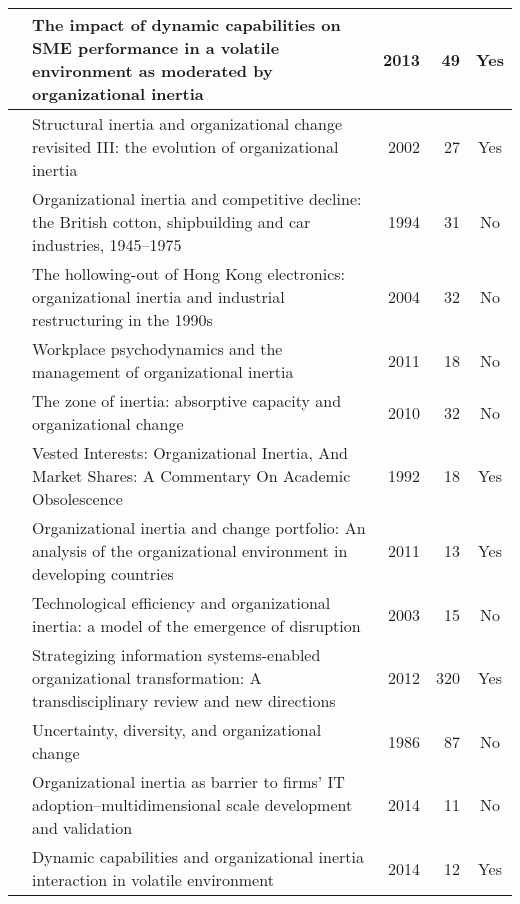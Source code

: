 \begin{longtable}{
    |>{\raggedright\arraybackslash}p{3.7cm}
    |>{\raggedright\arraybackslash}p{3.7cm}
    |r
    |r
    |c
    |}
	\hline 
    \cite{nedzinskas2013impact} & The impact of dynamic capabilities on SME performance in a volatile environment as moderated by organizational inertia & 2013 & 49 & Yes \\
	\hline 
    \cite{hannan2002structural} & Structural inertia and organizational change revisited III: the evolution of organizational inertia & 2002 & 27 & Yes \\
	\hline 
    \cite{lorenz1994organizational} & Organizational inertia and competitive decline: the British cotton, shipbuilding and car industries, 1945--1975 & 1994 & 31 & No \\
	\hline 
    \cite{chiu2004hollowing} & The hollowing-out of Hong Kong electronics: organizational inertia and industrial restructuring in the 1990s & 2004 & 32 & No \\
	\hline 
    \cite{allcorn2011workplace} & Workplace psychodynamics and the management of organizational inertia & 2011 & 18 & No \\
	\hline 
    \cite{godkin2010zone} & The zone of inertia: absorptive capacity and organizational change & 2010 & 32 & No \\
	\hline 
    \cite{bromley1992vested} & Vested Interests: Organizational Inertia, And Market Shares: A Commentary On Academic Obsolescence & 1992 & 18 & Yes \\
	\hline 
    \cite{majid2011organizational} & Organizational inertia and change portfolio: An analysis of the organizational environment in developing countries & 2011 & 13 & Yes \\
	\hline 
    \cite{buchta2003technological} & Technological efficiency and organizational inertia: a model of the emergence of disruption & 2003 & 15 & No \\
	\hline 
    \cite{besson2012strategizing} & Strategizing information systems-enabled organizational transformation: A transdisciplinary review and new directions & 2012 & 320 & Yes \\
	\hline 
    \cite{hannan1986uncertainty} & Uncertainty, diversity, and organizational change & 1986 & 87 & No \\
	\hline 
    \cite{haag2014organizational} & Organizational inertia as barrier to firms’ IT adoption--multidimensional scale development and validation & 2014 & 11 & No \\
	\hline 
    \cite{nedzinskas2014dynamic} & Dynamic capabilities and organizational inertia interaction in volatile environment & 2014 & 12 & Yes \\
	\hline 

\end{longtable}
